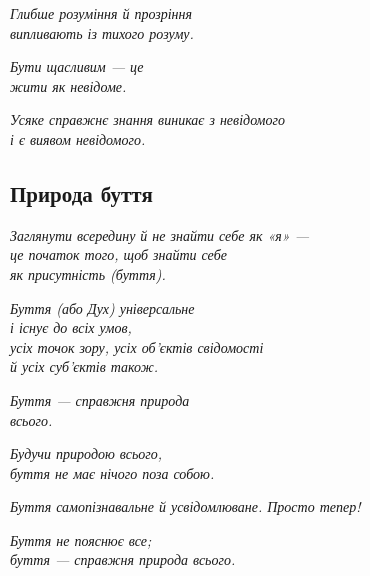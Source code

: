 \begin{center}\itshape
Глибше розуміння й прозріння\\
випливають із тихого розуму.
\end{center}

\begin{center}\itshape
Бути щасливим — це\\
жити як невідоме.
\end{center}

\begin{center}\itshape
Усяке справжнє знання виникає з невідомого\\
і є виявом невідомого.
\end{center}

\subsection*{Природа буття}

\begin{center}\itshape
Заглянути всередину й не знайти себе як «я» —\\
це початок того, щоб знайти себе\\
як присутність (буття).
\end{center}

\begin{center}\itshape
Буття (або Дух) універсальне\\
і існує до всіх умов,\\
усіх точок зору, усіх об'єктів свідомості\\
й усіх суб'єктів також.
\end{center}

\begin{center}\itshape
Буття — справжня природа\\
всього.
\end{center}

\begin{center}\itshape
Будучи природою всього,\\
буття не має нічого поза собою.
\end{center}

\begin{center}\itshape
Буття самопізнавальне й усвідомлюване. Просто тепер!
\end{center}

\begin{center}\itshape
Буття не пояснює все;\\
буття — справжня природа всього.
\end{center}

